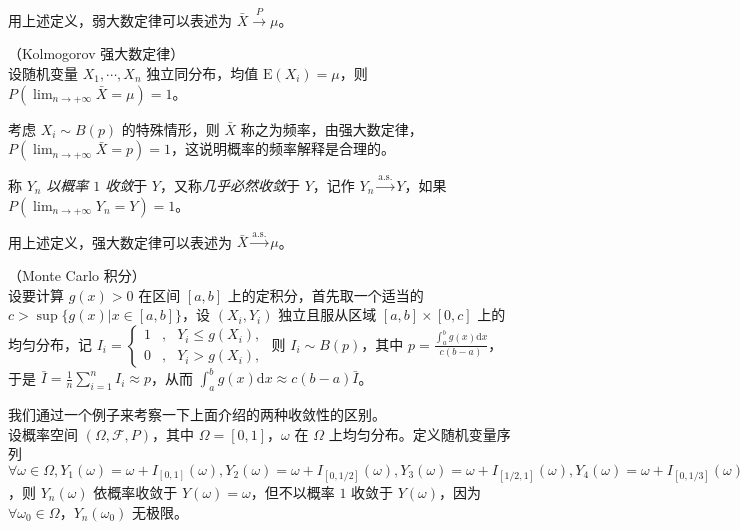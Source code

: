 \documentclass[../main.tex]{subfiles}
\begin{document}
用上述定义，弱大数定律可以表述为 $\bar X\overset{P}\rightarrow\mu$。

\begin{theorem}\label{thm:5.2.2}
    （Kolmogorov 强大数定律）\\
    设随机变量 $X_1,\cdots,X_n$ 独立同分布，均值 $\mathrm E(X_i)=\mu$，则 $P(\lim_{n\rightarrow+\infty}\bar X=\mu)=1$。
\end{theorem}

考虑 $X_i\sim B(p)$ 的特殊情形，则 $\bar X$ 称之为频率，由强大数定律，$P(\lim_{n\rightarrow+\infty}\bar X=p)=1$，这说明概率的频率解释是合理的。

\begin{definition}\label{def:5.2.2}
    称 $Y_n$ \emph{以概率 $1$ 收敛}于 $Y$，又称\emph{几乎必然收敛}于 $Y$，记作 $Y_n\overset{\mathrm{a.s.}}\rightarrow Y$，如果 $P(\lim_{n\rightarrow+\infty}Y_n=Y)=1$。
\end{definition}

用上述定义，强大数定律可以表述为 $\bar X\overset{\mathrm{a.s.}}\rightarrow\mu$。

\begin{example}
    （Monte Carlo 积分）\\
    设要计算 $g(x)>0$ 在区间 $[a,b]$ 上的定积分，首先取一个适当的 $c>\sup\{g(x)|x\in[a,b]\}$，设 $(X_i,Y_i)$ 独立且服从区域 $[a,b]\times[0,c]$ 上的均匀分布，记 $I_i=\left\{
        \begin{aligned}
            1 & , & Y_i\leq g(X_i), \\
            0 & , & Y_i>g(X_i),
        \end{aligned}
        \right.$ 则 $I_i\sim B(p)$，其中 $p=\frac{\int_a^b g(x)\mathrm{d}x}{c(b-a)}$，于是 $\bar I=\frac1n\sum_{i=1}^nI_i\approx p$，从而 $\int_a^b g(x)\mathrm{d}x\approx c(b-a)\bar I$。
\end{example}

\begin{example}
    我们通过一个例子来考察一下上面介绍的两种收敛性的区别。\\
    设概率空间 $(\Omega,\mathcal F,P)$，其中 $\Omega=[0,1]$，$\omega$ 在 $\Omega$ 上均匀分布。定义随机变量序列 $\forall\omega\in\Omega,Y_1(\omega)=\omega+I_{[0,1]}(\omega),Y_2(\omega)=\omega+I_{[0,1/2]}(\omega),Y_3(\omega)=\omega+I_{[1/2,1]}(\omega),Y_4(\omega)=\omega+I_{[0,1/3]}(\omega),Y_5(\omega)=\omega+I_{[1/3,2/3]}(\omega),Y_6(\omega)=\omega+I_{[2/3,1]}(\omega),\cdots$，则 $Y_n(\omega)$ 依概率收敛于 $Y(\omega)=\omega$，但不以概率 $1$ 收敛于 $Y(\omega)$，因为 $\forall \omega_0\in\Omega$，$Y_n(\omega_0)$ 无极限。
\end{example}
\end{document}
